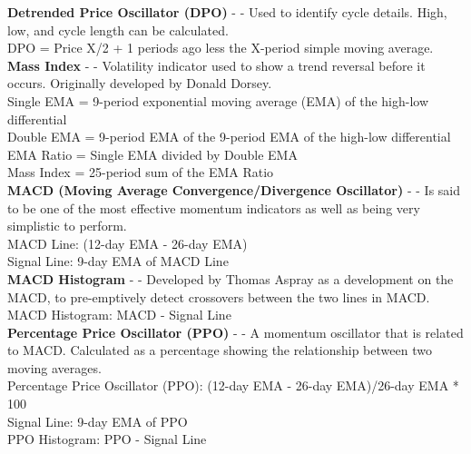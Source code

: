 \documentclass[conference]{IEEEtran}
\begin{document}

\noindent
\textbf{Detrended Price Oscillator (DPO)} - \cite{Murphy1999} - Used to identify cycle details. High, low, and cycle length can be calculated.\\

\noindent
DPO = Price {X/2 + 1} periods ago less the X-period simple moving average.\\

\noindent
\textbf{Mass Index} - \cite{Murphy1999} - Volatility indicator used to show a trend reversal before it occurs.  Originally developed by Donald Dorsey. \\

\noindent
Single EMA = 9-period exponential moving average (EMA) of the high-low differential \\
Double EMA = 9-period EMA of the 9-period EMA of the high-low differential \\
EMA Ratio = Single EMA divided by Double EMA \\
Mass Index = 25-period sum of the EMA Ratio \\

\noindent
\textbf{MACD (Moving Average Convergence/Divergence Oscillator)} - \cite{Appel2005} - Is said to be one of the most effective momentum indicators as well as being very simplistic to perform. \\

\noindent
MACD Line: (12-day EMA - 26-day EMA)\\
Signal Line: 9-day EMA of MACD Line\\

\noindent
\textbf{MACD Histogram} - \cite{Murphy1999} - Developed by Thomas Aspray as a development on the MACD, to pre-emptively detect crossovers between the two lines in MACD.\\

\noindent
MACD Histogram: MACD - Signal Line \\

\noindent
\textbf{Percentage Price Oscillator (PPO)} - \cite{Murphy1999} - A momentum oscillator that is related to MACD. Calculated as a percentage showing the relationship between two moving averages. \\

\noindent
Percentage Price Oscillator (PPO): {(12-day EMA - 26-day EMA)/26-day EMA} * 100 \\
Signal Line: 9-day EMA of PPO \\
PPO Histogram: PPO - Signal Line \\
\end{document}
